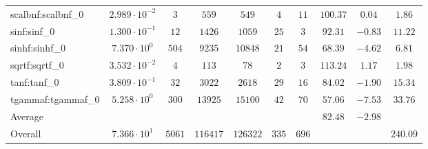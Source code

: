 \begin{tabular}{|l|c|c|c|c|c|c|c|c|c|}
scalbnf:scalbnf\_0       & $ 2.989 \cdot 10^{-2} $ & $ 3      $ & $ 559    $ & $ 549    $ & $ 4   $ & $ 11  $ & $ 100.37      $ & $ 0.04    $ & $ 1.86    $ \\
sinf:sinf\_0             & $ 1.300 \cdot 10^{-1} $ & $ 12     $ & $ 1426   $ & $ 1059   $ & $ 25  $ & $ 3   $ & $ 92.31       $ & $ -0.83   $ & $ 11.22   $ \\
sinhf:sinhf\_0           & $ 7.370 \cdot 10^{0}  $ & $ 504    $ & $ 9235   $ & $ 10848  $ & $ 21  $ & $ 54  $ & $ 68.39       $ & $ -4.62   $ & $ 6.81    $ \\
sqrtf:sqrtf\_0           & $ 3.532 \cdot 10^{-2} $ & $ 4      $ & $ 113    $ & $ 78     $ & $ 2   $ & $ 3   $ & $ 113.24      $ & $ 1.17    $ & $ 1.98    $ \\
tanf:tanf\_0             & $ 3.809 \cdot 10^{-1} $ & $ 32     $ & $ 3022   $ & $ 2618   $ & $ 29  $ & $ 16  $ & $ 84.02       $ & $ -1.90   $ & $ 15.34   $ \\
tgammaf:tgammaf\_0       & $ 5.258 \cdot 10^{0}  $ & $ 300    $ & $ 13925  $ & $ 15100  $ & $ 42  $ & $ 70  $ & $ 57.06       $ & $ -7.53   $ & $ 33.76   $ \\
\hline
Average                  & $                     $ & $        $ & $        $ & $        $ & $     $ & $     $ & $ 82.48       $ & $ -2.98   $ & $         $ \\
\hline
Overall                  & $ 7.366 \cdot 10^{1}  $ & $ 5061   $ & $ 116417 $ & $ 126322 $ & $ 335 $ & $ 696 $ & $             $ & $         $ & $ 240.09  $ \\
\hline
\end{tabular}
